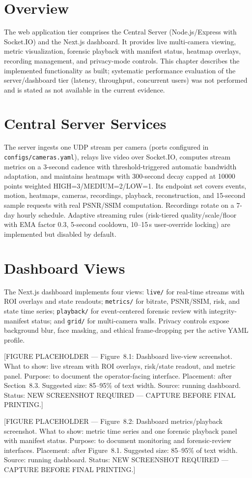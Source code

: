 \section{Overview}

The web application tier comprises the Central Server (Node.js/Express with Socket.IO) and the Next.js dashboard. It provides live multi-camera viewing, metric visualization, forensic playback with manifest status, heatmap overlays, recording management, and privacy-mode controls. This chapter describes the implemented functionality as built; systematic performance evaluation of the server/dashboard tier (latency, throughput, concurrent users) was not performed and is stated as not available in the current evidence.

\section{Central Server Services}

The server ingests one UDP stream per camera (ports configured in \texttt{configs/cameras.yaml}), relays live video over Socket.IO, computes stream metrics on a 3-second cadence with threshold-triggered automatic bandwidth adaptation, and maintains heatmaps with 300-second decay capped at 10000 points weighted HIGH=3/MEDIUM=2/LOW=1. Its endpoint set covers events, motion, heatmaps, cameras, recordings, playback, reconstruction, and 15-second sample requests with real PSNR/SSIM computation. Recordings rotate on a 7-day hourly schedule. Adaptive streaming rules (risk-tiered quality/scale/floor with EMA factor 0.3, 5-second cooldown, 10--15\,s user-override locking) are implemented but disabled by default.

\section{Dashboard Views}

The Next.js dashboard implements four views: \texttt{live/} for real-time streams with ROI overlays and state readouts; \texttt{metrics/} for bitrate, PSNR/SSIM, risk, and state time series; \texttt{playback/} for event-centered forensic review with integrity-manifest status; and \texttt{grid/} for multi-camera walls. Privacy controls expose background blur, face masking, and ethical frame-dropping per the active YAML profile.

[FIGURE PLACEHOLDER --- Figure~8.1: Dashboard live-view screenshot. What to show: live stream with ROI overlays, risk/state readout, and metric panel. Purpose: to document the operator-facing interface. Placement: after Section~8.3. Suggested size: 85--95\% of text width. Source: running dashboard. Status: NEW SCREENSHOT REQUIRED --- CAPTURE BEFORE FINAL PRINTING.]

[FIGURE PLACEHOLDER --- Figure~8.2: Dashboard metrics/playback screenshot. What to show: metric time series and one forensic playback panel with manifest status. Purpose: to document monitoring and forensic-review interfaces. Placement: after Figure~8.1. Suggested size: 85--95\% of text width. Source: running dashboard. Status: NEW SCREENSHOT REQUIRED --- CAPTURE BEFORE FINAL PRINTING.]
